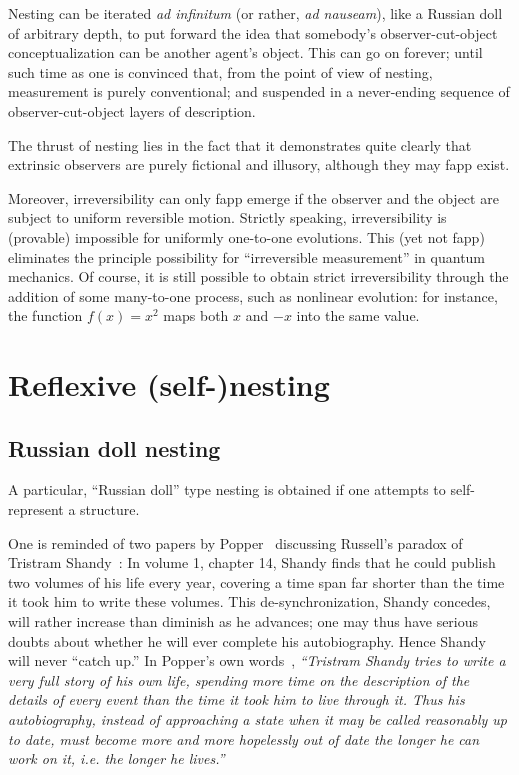 Nesting can be iterated {\it ad infinitum} (or rather, {\it ad nauseam}), like a Russian doll of arbitrary depth,
to put forward the idea that somebody's observer-cut-object conceptualization can be another agent's object.
This can go on forever; until such time as one is convinced that, from the point of view of nesting,
measurement is purely conventional; and suspended in a never-ending sequence of observer-cut-object layers of description.


The thrust of nesting lies in the fact that it demonstrates quite clearly that extrinsic observers
are purely fictional and illusory, although they may fapp exist.

Moreover, irreversibility  can only fapp emerge
if the observer and the object are subject to uniform reversible motion.
Strictly speaking, irreversibility is (provable) impossible for uniformly one-to-one evolutions.
This (yet not fapp) eliminates the principle possibility for ``irreversible measurement'' in quantum mechanics.
Of course, it is still possible to obtain strict irreversibility through the addition of some many-to-one process,
such as nonlinear evolution: for instance, the function $f(x) = x^2$ maps both $x$ and $-x$ into the same value.


\section{Reflexive (self-)nesting}
\label{2016-pu-book-refl_nesting}

\subsection{Russian doll nesting}

A particular, ``Russian doll'' type nesting is obtained if one attempts to self-represent a structure.

One is reminded of two papers by Popper~\cite{popper-50i,popper-50ii}
discussing Russell's paradox of
Tristram Shandy~\cite{sterne}:
In volume 1, chapter 14, Shandy finds that he could publish
two volumes of his life every year,
covering a time span far shorter than the time it took him to write
these volumes. This de-synchronization, Shandy concedes,
will rather increase than diminish as he advances; one may thus have serious doubts about
whether he will ever complete his autobiography.  Hence Shandy will never ``catch up.''
In Popper's own words~\cite[p.~174]{popper-50ii},
{\em ``Tristram Shandy tries to write a very full
story of his own life, spending more time on the description of the
details of every event than the time it took him to live through it.
Thus his autobiography, instead of approaching a state when it may
be called reasonably up to date, must become more and more hopelessly
out of date the longer he can work on it, i.e. the longer he lives.''}


